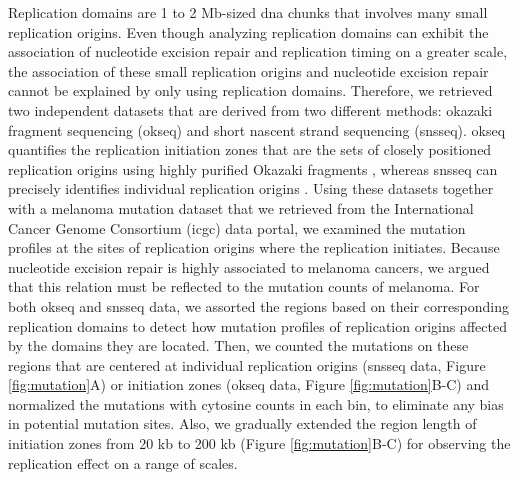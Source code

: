 Replication domains are 1 to 2 Mb-sized \gls{dna} chunks that involves many small replication origins. Even though analyzing replication domains can exhibit the association of nucleotide excision repair and replication timing on a greater scale, the association of these small replication origins and nucleotide excision repair cannot be explained by only using replication domains. Therefore, we retrieved two independent datasets that are derived from two different methods: okazaki fragment sequencing (\gls{okseq}) and short nascent strand sequencing (\gls{snsseq}). \gls{okseq} quantifies the replication initiation zones that are the sets of closely positioned replication origins using highly purified Okazaki fragments \citep{petryk2016replication}, whereas \gls{snsseq} can precisely identifies individual replication origins \citep{besnard2012unraveling,langley2016genome}. Using these datasets together with a melanoma mutation dataset that we retrieved from the International Cancer Genome Consortium (\gls{icgc}) data portal, we examined the mutation profiles at the sites of replication origins where the replication initiates. Because nucleotide excision repair is highly associated to melanoma cancers, we argued that this relation must be reflected to the mutation counts of melanoma. For both \gls{okseq} and \gls{snsseq} data, we assorted the regions based on their corresponding replication domains to detect how mutation profiles of replication origins affected by the domains they are located. Then, we counted the mutations on these regions that are centered at individual replication origins (\gls{snsseq} data, Figure \ref{fig:mutation}A) or initiation zones (\gls{okseq} data, Figure \ref{fig:mutation}B-C) and normalized the mutations with cytosine counts in each bin, to eliminate any bias in potential mutation sites. Also, we gradually extended the region length of initiation zones from 20 kb to 200 kb (Figure \ref{fig:mutation}B-C) for observing the replication effect on a range of scales.

